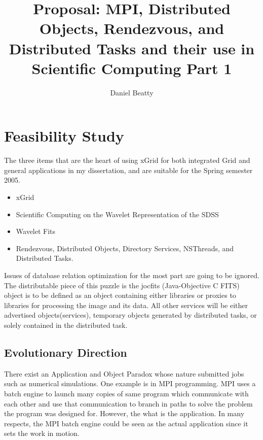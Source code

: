 \documentclass[11pt]{article}
\title{Proposal: MPI, Distributed Objects, Rendezvous, and Distributed Tasks and their use in Scientific Computing Part 1}
\author{Daniel Beatty}
\begin{document}
\maketitle

\section {Feasibility Study}
The three items that are the heart of using xGrid for both integrated Grid and general applications in my dissertation, and are suitable for the Spring semester 2005.    
\begin{itemize}
\item xGrid
\item Scientific Computing on the Wavelet Representation of the SDSS
\item Wavelet Fits
\item Rendezvous, Distributed Objects, Directory Services, NSThreads, and Distributed Tasks.
\end{itemize}
\newpage
Issues of database relation optimization for the most part are going to be ignored.  The distributable piece of this puzzle is the jocfits (Java-Objective C FITS) object is to be defined as an object containing either libraries or proxies to libraries for processing the image and its data.   All other services will be either advertised objects(services), temporary objects generated by distributed tasks, or solely contained in the distributed task.  



\subsection {Evolutionary Direction}
There exist an Application and Object Paradox whose nature submitted jobs such as numerical simulations.  One example is in MPI programming.  %
MPI uses a batch engine to launch many copies of same program which communicate with each other and use that communication to branch in paths to solve the problem the program was designed for.  
However, the what is the application.  In many respects, the MPI batch engine could be seen as the actual application since it sets the work in motion.   
\end{document}
